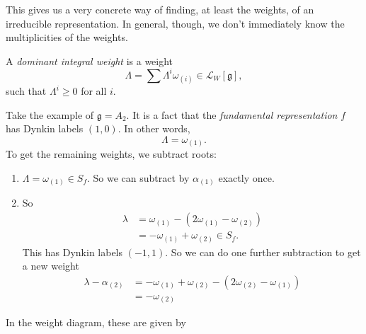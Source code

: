 \documentclass[a4paper]{article}
\begin{document}
This gives us a very concrete way of finding, at least the weights, of an irreducible representation. In general, though, we don't immediately know the multiplicities of the weights.

\begin{defi}
  A \emph{dominant integral weight} is a weight
  \[
    \Lambda = \sum \Lambda^i \omega_{(i)} \in \mathcal{L}_W[\mathfrak{g}],
  \]
  such that $\Lambda^i \geq 0$ for all $i$.
\end{defi}

\begin{eg}
  Take the example of $\mathfrak{g} = A_2$. It is a fact that the \emph{fundamental representation} $f$ has Dynkin labels $(1, 0)$. In other words,
  \[
    \Lambda = \omega_{(1)}.
  \]
  To get the remaining weights, we subtract roots:
  \begin{enumerate}
    \item $\Lambda = \omega_{(1)} \in S_f$. So we can subtract by $\alpha_{(1)}$ exactly once.
    \item So
      \begin{align*}
        \lambda &= \omega_{(1)} - (2 \omega_{(1)} - \omega_{(2)}) \\
        &= - \omega_{(1)} + \omega_{(2)} \in S_f.
      \end{align*}
      This has Dynkin labels $(-1, 1)$. So we can do one further subtraction to get a new weight
      \begin{align*}
        \lambda - \alpha_{(2)} &= - \omega_{(1)} + \omega_{(2)} - (2 \omega_{(2)} - \omega_{(1)})\\
        &= -\omega_{(2)}
      \end{align*}
  \end{enumerate}
  In the weight diagram, these are given by
  \begin{center}
\end{center}
\end{eg}
\end{document}
